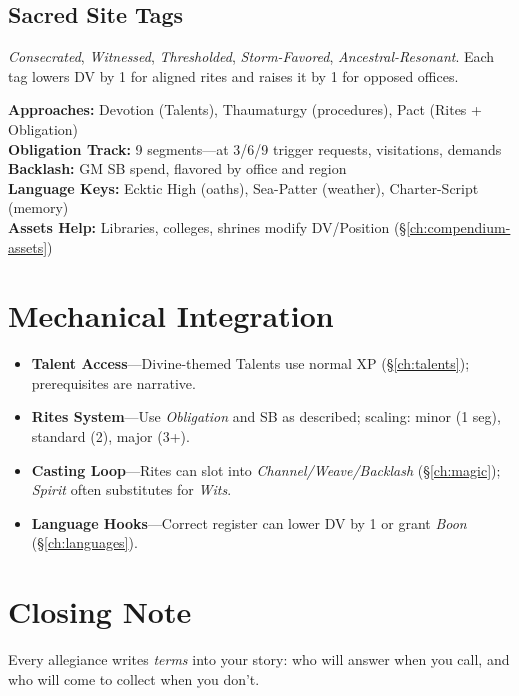 \subsection*{Sacred Site Tags}
\textit{Consecrated}, \textit{Witnessed}, \textit{Thresholded}, \textit{Storm-Favored}, \textit{Ancestral-Resonant}. Each tag lowers DV by 1 for aligned rites and raises it by 1 for opposed offices.

\begin{tcolorbox}[colback=purple!5!white,colframe=purple!75!black,title=Divine \& Patron Quick Reference,fonttitle=\bfseries]
\textbf{Approaches:} Devotion (Talents), Thaumaturgy (procedures), Pact (Rites + Obligation) \\
\textbf{Obligation Track:} 9 segments—at 3/6/9 trigger requests, visitations, demands \\
\textbf{Backlash:} GM SB spend, flavored by office and region \\
\textbf{Language Keys:} Ecktic High (oaths), Sea-Patter (weather), Charter-Script (memory) \\
\textbf{Assets Help:} Libraries, colleges, shrines modify DV/Position (\S\ref{ch:compendium-assets})
\end{tcolorbox}

\section{Mechanical Integration}
\begin{itemize}
  \item \textbf{Talent Access}—Divine-themed Talents use normal XP (\S\ref{ch:talents}); prerequisites are narrative.
  \item \textbf{Rites System}—Use \emph{Obligation} and SB as described; scaling: minor (1 seg), standard (2), major (3+).
  \item \textbf{Casting Loop}—Rites can slot into \emph{Channel/Weave/Backlash} (\S\ref{ch:magic}); \emph{Spirit} often substitutes for \emph{Wits}.
  \item \textbf{Language Hooks}—Correct register can lower DV by 1 or grant \emph{Boon} (\S\ref{ch:languages}).
\end{itemize}

\section*{Closing Note}
Every allegiance writes \emph{terms} into your story: who will answer when you call, and who will come to collect when you don't.